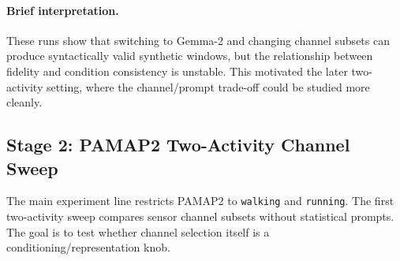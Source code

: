 \paragraph{Brief interpretation.}
These runs show that switching to Gemma-2 and changing channel subsets can
produce syntactically valid synthetic windows, but the relationship between
fidelity and condition consistency is unstable. This motivated the later
two-activity setting, where the channel/prompt trade-off could be studied more
cleanly.

\subsection*{Stage 2: PAMAP2 Two-Activity Channel Sweep}

The main experiment line restricts PAMAP2 to \texttt{walking} and
\texttt{running}. The first two-activity sweep compares sensor channel subsets
without statistical prompts. The goal is to test whether channel selection
itself is a conditioning/representation knob.

\begin{table}[t]
\centering
\small
\caption{PAMAP2 two-activity Gemma channel sweep without statistical prompts.
ED/real and DTW/real are computed against the corresponding real-vs-real
baseline for each channel group.}
\label{tab:shanjun-channel}
\end{table}

